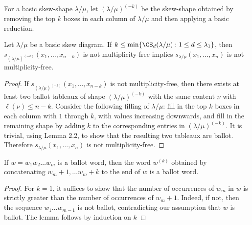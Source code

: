 \begin{defi}
For a basic skew-shape $\lambda/\mu$, let $(\lambda/\mu)^{(-k)}$ be the skew-shape obtained by removing the top $k$ boxes in each column of $\lambda/\mu$ and then applying a basic reduction.
\end{defi}
\begin{lemma}\label{Lemma:krowreduction}
Let $\lambda / \mu$ be a basic skew diagram. If $k\leq \min\{ \CS _d(\lambda/\mu):1\leq d\leq \lambda_1\}$, then $s_{(\lambda/\mu)^{(-k)}}(x_1,\ldots,x_{n-k})$ is not multiplicity-free implies $s_{\lambda/\mu}(x_1,\ldots,x_n)$ is not multiplicity-free.
\end{lemma}
\begin{proof}
If $s_{(\lambda/\mu)^{(-k)}}(x_1,\ldots,x_{n-k})$ is not multiplicity-free, then there exists at least two ballot tableaux of shape $(\lambda/\mu)^{(-k)}$ with the same content $\nu$ with $\ell(\nu)\leq n-k$. Consider the following filling of $\lambda/\mu$: fill in the top $k$ boxes in each column with $1$ through $k$, with values increasing downwards, and fill in the remaining shape by adding $k$ to the corresponding entries in $(\lambda/\mu)^{(-k)}$. It is trivial, using Lemma 2.2, to show that the resulting two tableaux are ballot. Therefore $s_{\lambda/\mu}(x_1,\ldots,x_n)$ is not multiplicity-free.
\end{proof}
\begin{lemma}\label{Lemma:ballot}
If $w = w_1w_2\ldots w_m$ is a ballot word, then the word $w^{(k)}$ obtained by concatenating $w_m+1,\ldots w_m+k$ to the end of $w$ is a ballot word.
\end{lemma}

\begin{proof}
For $k=1$, it suffices to show that the number of occurrences of $w_m$ in $w$ is strictly greater than the number of occurrences of $w_m+1$. Indeed, if not, then the sequence $w_1\ldots w_{m-1}$ is not ballot, contradicting our assumption that $w$ is ballot. The lemma follows by induction on $k$
\end{proof}

